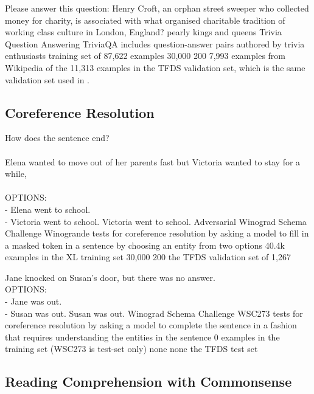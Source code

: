 \taskio
{Please answer this question: Henry Croft, an orphan street sweeper who collected money for charity, is associated with what organised charitable tradition of working class culture in London, England?}
{pearly kings and queens}
{
    \taskdescription
    {Trivia Question Answering} %
    {TriviaQA} %
    {\cite{JoshiTriviaQA2017}} %
    {includes question-answer pairs authored by trivia enthusiasts} %
    {training set of 87,622 examples} %
    {30,000} %
    {200} %
    {7,993 examples from Wikipedia of the 11,313 examples in the TFDS validation set, which is the same validation set used in \citep{brown2020language}.} %
}

\clearpage 
\subsection{Coreference Resolution}\label{appen:b-coreference}

\taskio
{How does the sentence end?\\\\Elena wanted to move out of her parents fast but Victoria wanted to stay for a while, \\\\OPTIONS:\\- Elena went to school.\\- Victoria went to school.}
{Victoria went to school.}
{
    \taskdescription
    {Adversarial Winograd Schema Challenge} %
    {Winogrande} %
    {\citep{sakaguchi2020winogrande}} %
    {tests for coreference resolution by asking a model to fill in a masked token in a sentence by choosing an entity from two options} %
    {40.4k examples in the XL training set} %
    {30,000} %
    {200} %
    {the TFDS validation set of 1,267} %
}

\taskio
{Jane knocked on Susan's door, but there was no answer.\\OPTIONS:\\- Jane was out.\\- Susan was out.}
{Susan was out.}
{
    \taskdescription
    {Winograd Schema Challenge} %
    {WSC273} %
    {\citep{levesque2012winograd}} %
    {tests for coreference resolution by asking a model to complete the sentence in a fashion that requires understanding the entities in the sentence} %
    {0 examples in the training set (WSC273 is test-set only)} %
    {none} %
    {none} %
    {the TFDS test set} %
}

\clearpage
\subsection{Reading Comprehension with Commonsense}\label{appen:b-read-comp-commonsense}

